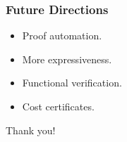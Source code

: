 \begin{frame}
  \frametitle{Future Directions}
  \begin{sticky}
    \vspace{-.7cm}
    \begin{itemize}
    \item Proof automation.
    \item More expressiveness.
    \item Functional verification.
    \item Cost certificates.
    \end{itemize}
  \end{sticky}
\end{frame}

\begin{frame}
  \begin{sticky}
    \Large
    Thank you!
  \end{sticky}
\end{frame}
